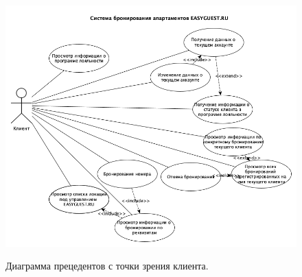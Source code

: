 \begin{figure}[h]
	\begin{center}
		{\includegraphics[scale = 0.56]{img/use-case/client.png}}
		\caption{Диаграмма прецедентов с точки зрения клиента.}
		\label{fig:use-case-client}
	\end{center}
\end{figure}

